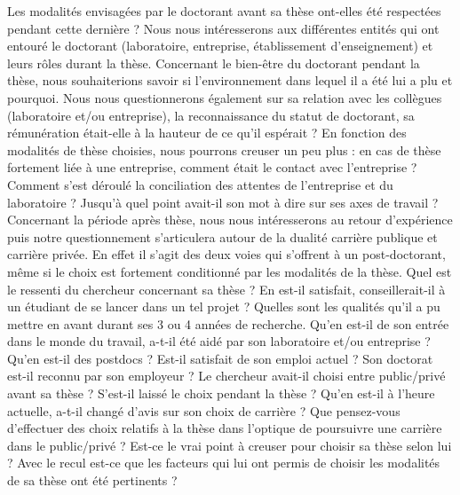 \documentclass[12pt]{article}
\begin{document}
Les modalités envisagées par le doctorant avant sa thèse ont-elles été respectées pendant cette dernière ? Nous nous intéresserons aux différentes entités qui ont entouré le doctorant (laboratoire, entreprise, établissement d’enseignement) et leurs rôles durant la thèse. 
Concernant le bien-être du doctorant pendant la thèse, nous souhaiterions savoir si l’environnement dans lequel il a été lui a plu et pourquoi. Nous nous questionnerons également sur sa relation avec les collègues (laboratoire et/ou entreprise), la reconnaissance du statut de doctorant, sa rémunération était-elle à la hauteur de ce qu’il espérait ? 
En fonction des modalités de thèse choisies, nous pourrons creuser un peu plus : en cas de thèse fortement liée à une entreprise, comment était le contact avec l’entreprise ? Comment s’est déroulé la conciliation des attentes de l’entreprise et du laboratoire ? Jusqu’à quel point avait-il son mot à dire sur ses axes de travail ?
Concernant la période après thèse, nous nous intéresserons au retour d’expérience puis notre questionnement s’articulera autour de la dualité carrière publique et carrière privée. En effet il s’agit des deux voies qui s’offrent à un post-doctorant, même si le choix est fortement conditionné par les modalités de la thèse.
Quel est le ressenti du chercheur concernant sa thèse ? En est-il satisfait, conseillerait-il à un étudiant de se lancer dans un tel projet ? Quelles sont les qualités qu’il a pu mettre en avant durant ses 3 ou 4 années de recherche.
Qu'en est-il de son entrée dans le monde du travail, a-t-il été aidé par son laboratoire et/ou entreprise ? Qu'en est-il des postdocs ? Est-il satisfait de son emploi actuel ? Son doctorat est-il reconnu par son employeur ?
Le chercheur avait-il choisi entre public/privé avant sa thèse ? S'est-il laissé le choix pendant la thèse ? Qu'en est-il à l’heure actuelle, a-t-il changé d’avis sur son choix de carrière ? Que pensez-vous d'effectuer des choix relatifs à la thèse dans l'optique de poursuivre une carrière dans le public/privé ?
Est-ce le vrai point à creuser pour choisir sa thèse selon lui ? Avec le recul est-ce que les facteurs qui lui ont permis de choisir les modalités de sa thèse ont été pertinents ?


\end{document}
